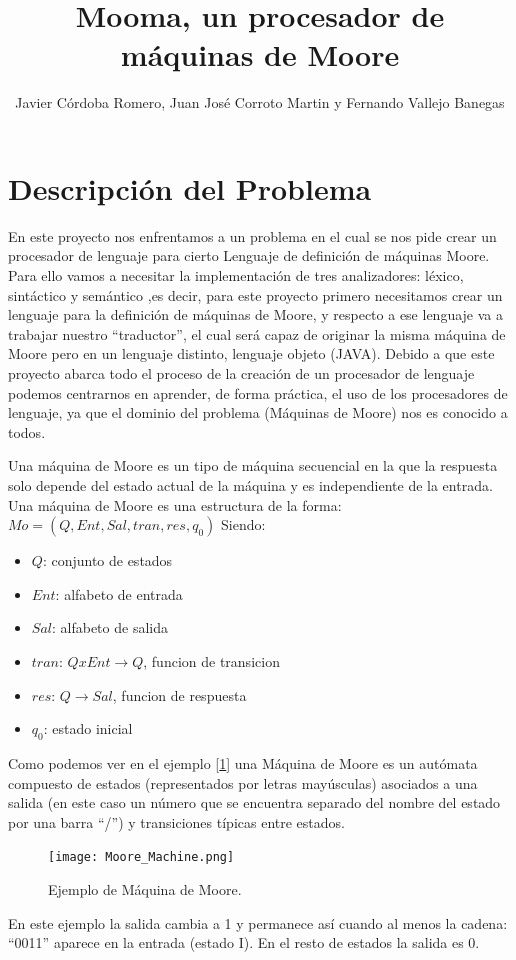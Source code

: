 \documentclass{pre-tfg}
\title{Mooma, un procesador de máquinas de Moore}
\author{Javier Córdoba Romero, Juan José Corroto Martin y Fernando Vallejo Banegas}
\begin{document}
\maketitle
\tableofcontents

\newpage
\section{Descripción del Problema}
En este proyecto nos enfrentamos a un problema en el cual se nos pide crear un procesador de lenguaje para cierto Lenguaje de definición de máquinas Moore. Para ello vamos a necesitar la implementación de tres analizadores: léxico, sintáctico y semántico
,es decir, para este proyecto primero necesitamos crear un lenguaje para la definición de máquinas de Moore, y respecto a ese lenguaje va a trabajar nuestro “traductor”, el cual será capaz de originar la misma máquina de Moore pero en un lenguaje distinto, lenguaje objeto (JAVA).
Debido a que este proyecto abarca todo el proceso de la creación de un procesador de lenguaje podemos centrarnos en aprender, de forma práctica, el uso de los procesadores de lenguaje, ya que el dominio del problema (Máquinas de Moore) nos es conocido a todos. 

Una máquina de Moore es un tipo de máquina secuencial en la que la respuesta solo depende del estado actual de la máquina y es independiente de la entrada.
Una máquina de Moore es una estructura de la forma:
$Mo = (Q, Ent, Sal, tran, res, q_0)$
Siendo:
\begin{itemize}
    \item $Q$: conjunto de estados
    \item $Ent$: alfabeto de entrada
    \item $Sal$: alfabeto de salida
    \item $tran$: $ Q x Ent \rightarrow Q$, funcion de transicion
    \item $res$: $Q \rightarrow Sal$, funcion de respuesta
    \item $q_0$: estado inicial
\end{itemize}
\bigskip
Como podemos ver en el ejemplo [\ref{fig:MooreMachineExample}] una Máquina de Moore es un autómata compuesto de estados (representados por letras mayúsculas) asociados a una salida (en este caso un número que se encuentra separado del nombre del estado por una barra ``\slash'') y transiciones típicas entre estados.
\begin{figure}[htb]
	\centering
	\texttt{[image: Moore\_Machine.png]}
	\caption{Ejemplo de Máquina de Moore.}
	\label{fig:MooreMachineExample}
\end{figure}
En este ejemplo la salida cambia a 1 y permanece así cuando al menos la cadena: ``0011'' aparece en la entrada (estado I). En el resto de estados la salida es 0.
\end{document}
